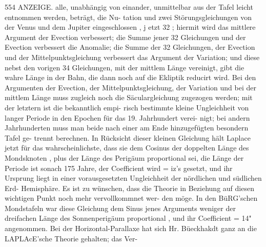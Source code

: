 \documentclass[12pt,a4paper]{article}
\begin{document}
\newpage
554 ANZEIGE.\newline
alle, unabhängig von einander, unmittelbar aus der Tafel leicht entnommen werden, beträgt, die Nu-\newline
tation und zwei Störungsgleichungen von der Venus und dem Jupiter eingeschlossen , j etzt 32 ; hiermit\newline
wird das mittlere Argument der Evection verbessert; die Summe jener 32 Gleichungen und der Evection\newline
verbessert die Anomalie; die Summe der 32 Gleichungen, der Evection und der Mittelpunktsgleichung\newline
verbessert das Argument der Variation; und diese nebst den vorigen 34 Gleichungen, mit der mittlem\newline
Länge vereinigt, gibt die wahre Länge in der Bahn, die dann noch auf die Ekliptik reducirt wird.\newline
Bei den Argumenten der Evection, der Mittelpunktsgleichung, der Variation und bei der mittlem Länge\newline
muss zugleich noch die Säculargleichung zugezogen werden; mit der letztern ist die bekanntlich empi-\newline
risch bestimmte kleine Ungleichheit von langer Periode in den Epochen für das 19. Jahrhundert verei-\newline
nigt; bei andern Jahrhunderten muss man beide nach einer am Ende hinzugefügten besondern Tafel ge-\newline
trennt berechnen. In Rücksicht dieser kleinen Gleichung hält Laplace jetzt für das wahrscheinlichste,\newline
dass sie dem Cosinus der doppelten Länge des Mondsknoten , plus der Länge des Perigäum proportional\newline
sei, die Länge der Periode ist sonach 175 Jahre, der Coefficient wird = iz's gesetzt, und ihr Ursprung\newline
liegt in einer vorausgesetzten Ungleichheit der nördlichen und südlichen Erd- Hemisphäre. Es ist zu\newline
wünschen, dass die Theorie in Beziehung auf diesen wichtigen Punkt noch mehr vervollkommnet wer-\newline
den möge. In den BüRG'schen Mondstafeln war diese Gleichung dem Sinus jenes Arguments weniger\newline
der dreifachen Länge des Sonnenperigäum proportional , und ihr Coefficient = 14" angenommen. Bei\newline
der Horizontal-Parallaxe hat sich Hr. Büeckhakdt ganz an die LAPLAcE'sche Theorie gehalten; das Ver-\newline
\end{document}
